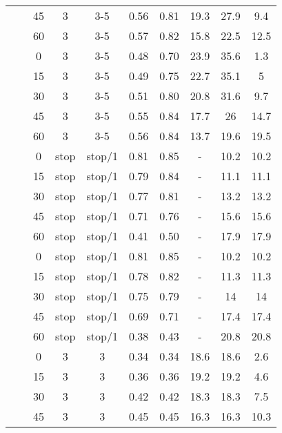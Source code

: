 \begin{longtable}[t]{cccccccccc}
	&  & 45 & 3 & 3-5 & 0.56 & 0.81 & 19.3 & 27.9 & 9.4\\
	\nopagebreak
	& \multirow{-5}{*}{\centering\arraybackslash 0.2} & 60 & 3 & 3-5 & 0.57 & 0.82 & 15.8 & 22.5 & 12.5\\
	\nopagebreak
	&  & 0 & 3 & 3-5 & 0.48 & 0.70 & 23.9 & 35.6 & 1.3\\
	\nopagebreak
	&  & 15 & 3 & 3-5 & 0.49 & 0.75 & 22.7 & 35.1 & 5\\
	\nopagebreak
	&  & 30 & 3 & 3-5 & 0.51 & 0.80 & 20.8 & 31.6 & 9.7\\
	\nopagebreak
	&  & 45 & 3 & 3-5 & 0.55 & 0.84 & 17.7 & 26 & 14.7\\
	\nopagebreak
	\multirow{-10}{*}{\centering\arraybackslash 7} & \multirow{-5}{*}{\centering\arraybackslash 0.33} & 60 & 3 & 3-5 & 0.56 & 0.84 & 13.7 & 19.6 & 19.5\\
	\cmidrule{1-10}\pagebreak[0]
	&  & 0 & stop & stop/1 & 0.81 & 0.85 & - & 10.2 & 10.2\\
	\nopagebreak
	&  & 15 & stop & stop/1 & 0.79 & 0.84 & - & 11.1 & 11.1\\
	\nopagebreak
	&  & 30 & stop & stop/1 & 0.77 & 0.81 & - & 13.2 & 13.2\\
	\nopagebreak
	&  & 45 & stop & stop/1 & 0.71 & 0.76 & - & 15.6 & 15.6\\
	\nopagebreak
	& \multirow{-5}{*}{\centering\arraybackslash 0.2} & 60 & stop & stop/1 & 0.41 & 0.50 & - & 17.9 & 17.9\\
	\nopagebreak
	&  & 0 & stop & stop/1 & 0.81 & 0.85 & - & 10.2 & 10.2\\
	\nopagebreak
	&  & 15 & stop & stop/1 & 0.78 & 0.82 & - & 11.3 & 11.3\\
	\nopagebreak
	&  & 30 & stop & stop/1 & 0.75 & 0.79 & - & 14 & 14\\
	\nopagebreak
	&  & 45 & stop & stop/1 & 0.69 & 0.71 & - & 17.4 & 17.4\\
	\nopagebreak
	\multirow{-10}{*}{\centering\arraybackslash 8} & \multirow{-5}{*}{\centering\arraybackslash 0.33} & 60 & stop & stop/1 & 0.38 & 0.43 & - & 20.8 & 20.8\\
	\cmidrule{1-10}\pagebreak[0]
	&  & 0 & 3 & 3 & 0.34 & 0.34 & 18.6 & 18.6 & 2.6\\
	\nopagebreak
	&  & 15 & 3 & 3 & 0.36 & 0.36 & 19.2 & 19.2 & 4.6\\
	\nopagebreak
	&  & 30 & 3 & 3 & 0.42 & 0.42 & 18.3 & 18.3 & 7.5\\
	\nopagebreak
	&  & 45 & 3 & 3 & 0.45 & 0.45 & 16.3 & 16.3 & 10.3\\

\end{longtable}

